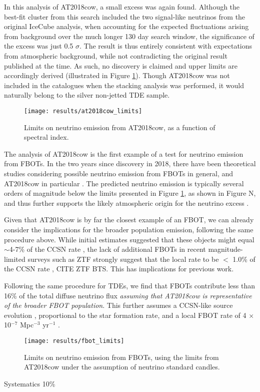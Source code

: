 In this analysis of AT2018cow, a small excess was again found. Although the best-fit cluster from this search included the two signal-like neutrinos from the original IceCube analysis, when accounting for the expected fluctuations arising from background over the much longer 130 day search window, the significance of the excess was just 0.5 $\sigma$. The result is thus entirely consistent with expectations from atmospheric background, while not contradicting the original result published at the time. As such, no discovery is claimed and upper limits are accordingly derived (illustrated in Figure \ref{fig:at2018cow_limits}). Though AT2018cow was not included in the catalogues when the stacking analysis was performed, it would naturally belong to the silver non-jetted TDE sample. 

\begin{figure}[!ht]
	\centering \texttt{[image: results/at2018cow\_limits]}
	\caption{Limits on neutrino emission from AT2018cow, as a function of spectral index.}
	\label{fig:at2018cow_limits}
\end{figure}

The analysis of AT2018cow is the first example of a test for neutrino emission from FBOTs. In the two years since discovery in 2018, there have been theoretical studies considering possible neutrino emission from FBOTs in general, and AT2018cow in particular . The predicted neutrino emission is typically several orders of magnitude below the limits presented in Figure \ref{fig:at2018cow_limits}, as shown in Figure N, and thus further supports the likely atmospheric origin for the neutrino excess \cite{2018ATel11785....1B}.

Given that AT2018cow is by far the closest example of an FBOT, we can already consider the implications for the broader population emission, following the same procedure above. While initial estimates suggested that these objects might equal $\sim$4-7\% of the CCSN rate \cite{drout_fbot, fang_fbot}, the lack of additional FBOTs in recent magnitude-limited surveys such as ZTF strongly suggest that the local rate to be $<$ 1.0\% of the CCSN rate , CITE ZTF BTS. This has implications for previous work. 

Following the same procedure for TDEs, we find that FBOTs contribute less than 16\% of the total diffuse neutrino flux \emph{assuming that AT2018cow is representative of the broader FBOT population}. This further assumes a CCSN-like source evolution , proportional to the star formation rate, and a local FBOT rate of 4 $\times$ 10$^{-7}$ Mpc$^{-3}$ yr$^{-1}$ \cite{ho_koala}.

\begin{figure}[!ht]
	\centering \texttt{[image: results/fbot\_limits]}
	\caption{Limits on neutrino emission from FBOTs, using the limits from AT2018cow under the assumption of neutrino standard candles.}
	\label{fig:fbot_limits}
\end{figure}

Systematics 10\%